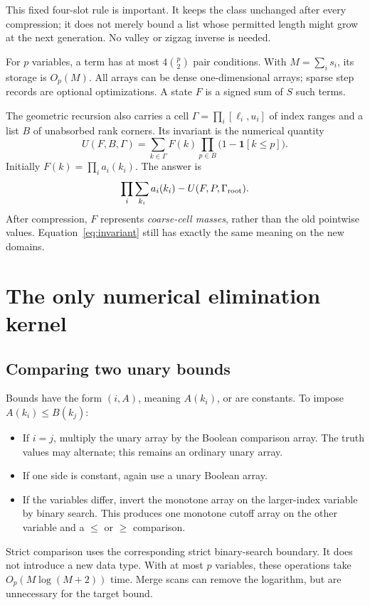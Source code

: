 \documentclass[12pt,a4paper]{article}
\theoremstyle{remark}
\newcommand{\1}{\mathbf1}
\begin{document}
This fixed four-slot rule is important. It keeps the class unchanged after
every compression; it does not merely bound a list whose permitted length
might grow at the next generation. No valley or zigzag inverse is needed.

For $p$ variables, a term has at most $4\binom p2$ pair conditions.
With $M=\sum_i s_i$, its storage is $O_p(M)$. All arrays can be dense
one-dimensional arrays; sparse step records are optional optimizations.
A state $F$ is a signed sum of $S$ such terms.

The geometric recursion also carries a cell
$\Gamma=\prod_i[\ell_i,u_i]$ of index ranges and a list $B$ of
unabsorbed rank corners. Its invariant is the numerical quantity
\begin{equation}
 U(F,B,\Gamma)=\sum_{k\in\Gamma}F(k)
                   \prod_{p\in B}\bigl(1-\1[k\le p]\bigr).
                                                        \label{eq:invariant}
\end{equation}
Initially $F(k)=\prod_i a_i(k_i)$. The answer is
\begin{equation}
       \prod_i\sum_{k_i}a_i(k_i)-U(F,P,\Gamma_{\rm root}).
                                                        \label{eq:answer}
\end{equation}
After compression, $F$ represents \emph{coarse-cell masses}, rather than
the old pointwise values. Equation~\eqref{eq:invariant} still has exactly
the same meaning on the new domains.

\section{The only numerical elimination kernel}\label{sec:kernel}
\subsection{Comparing two unary bounds}
Bounds have the form $(i,A)$, meaning $A(k_i)$, or are constants.
To impose $A(k_i)\le B(k_j)$:
\begin{itemize}
\item If $i=j$, multiply the unary array by the Boolean comparison array.
      The truth values may alternate; this remains an ordinary unary array.
\item If one side is constant, again use a unary Boolean array.
\item If the variables differ, invert the monotone array on the larger-index
      variable by binary search. This produces one monotone cutoff array
      on the other variable and a $\le$ or $\ge$ comparison.
\end{itemize}
Strict comparison uses the corresponding strict binary-search boundary.
It does not introduce a new data type. With at most $p$ variables, these
operations take $O_p(M\log(M+2))$ time. Merge scans can remove the logarithm,
but are unnecessary for the target bound.
\end{document}
